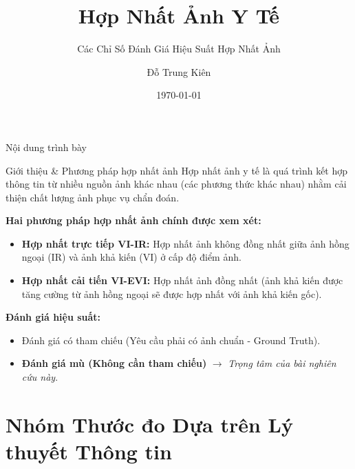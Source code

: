 \documentclass{beamer}
\title{Hợp Nhất Ảnh Y Tế}
\subtitle{Các Chỉ Số Đánh Giá Hiệu Suất Hợp Nhất Ảnh}
\author{Đỗ Trung Kiên}
\institute{Đại học Bách khoa Hà Nội}
\date{\today}
\begin{document}
\frame{\titlepage}

\begin{frame}{Nội dung trình bày}
    \tableofcontents
\end{frame}

\begin{frame}{Giới thiệu \& Phương pháp hợp nhất ảnh}
    Hợp nhất ảnh y tế là quá trình kết hợp thông tin từ nhiều nguồn ảnh khác nhau (các phương thức khác nhau) nhằm cải thiện chất lượng ảnh phục vụ chẩn đoán.

    \vspace{0.4cm}
    \textbf{Hai phương pháp hợp nhất ảnh chính được xem xét:}
    \begin{itemize}
        \item \textbf{Hợp nhất trực tiếp VI-IR:} Hợp nhất ảnh không đồng nhất giữa ảnh hồng ngoại (IR) và ảnh khả kiến (VI) ở cấp độ điểm ảnh.
        \item \textbf{Hợp nhất cải tiến VI-EVI:} Hợp nhất ảnh đồng nhất (ảnh khả kiến được tăng cường từ ảnh hồng ngoại sẽ được hợp nhất với ảnh khả kiến gốc).
    \end{itemize}

    \vspace{0.4cm}
    \textbf{Đánh giá hiệu suất:}
    \begin{itemize}
        \item Đánh giá có tham chiếu (Yêu cầu phải có ảnh chuẩn - Ground Truth).
        \item \textbf{Đánh giá mù (Không cần tham chiếu)} $\rightarrow$ \textit{Trọng tâm của bài nghiên cứu này}.
    \end{itemize}
\end{frame}


\section{Nhóm Thước đo Dựa trên Lý thuyết Thông tin}
\end{document}
